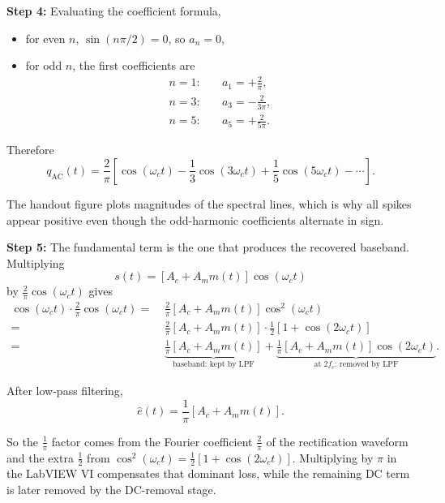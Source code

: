 \begin{tcolorbox}[breakable, colback=orange!5!white,
colframe=orange!60!black,
title={\textbf{Intuition: Fourier Series of the Rectification Function (Part 3: Final Series and the $\tfrac{1}{\pi}$ Result)}}]
\textbf{Step 4:} Evaluating the coefficient formula,
\begin{itemize}
\item for even $n$, $\sin(n\pi/2)=0$, so $a_n=0$,
\item for odd $n$, the first coefficients are
\begin{align}
n=1:&\quad a_1 = +\frac{2}{\pi}, \\
n=3:&\quad a_3 = -\frac{2}{3\pi}, \\
n=5:&\quad a_5 = +\frac{2}{5\pi}.
\end{align}
\end{itemize}

Therefore
\begin{equation}
\boxed{q_{\mathrm{AC}}(t)=\frac{2}{\pi}\left[
\cos(\omega_c t)-\frac{1}{3}\cos(3\omega_c t)
+\frac{1}{5}\cos(5\omega_c t)-\cdots\right]}.
\end{equation}

The handout figure plots magnitudes of the spectral lines, which is why all
spikes appear positive even though the odd-harmonic coefficients alternate in
sign.

\textbf{Step 5:} The fundamental term is the one that produces the recovered
baseband. Multiplying
\begin{equation}
s(t)=\left[A_c + A_m m(t)\right]\cos(\omega_c t)
\end{equation}
by $\tfrac{2}{\pi}\cos(\omega_c t)$ gives
\begin{align}
[A_c + A_m m(t)]\cos(\omega_c t)\cdot \frac{2}{\pi}\cos(\omega_c t)
=\;&\frac{2}{\pi}[A_c + A_m m(t)]\cos^2(\omega_c t)\nonumber\\
=\;&\frac{2}{\pi}[A_c + A_m m(t)]\cdot\frac{1}{2}
\left[1+\cos(2\omega_c t)\right]\nonumber\\
=\;&\underbrace{\frac{1}{\pi}[A_c + A_m m(t)]}_{\text{baseband: kept by LPF}}
+\underbrace{\frac{1}{\pi}[A_c + A_m m(t)]\cos(2\omega_c t)}_{\text{at }2f_c\text{: removed by LPF}}.
\end{align}

After low-pass filtering,
\begin{equation}
\boxed{\hat{e}(t)=\frac{1}{\pi}[A_c + A_m m(t)]}.
\end{equation}

So the $\tfrac{1}{\pi}$ factor comes from the Fourier coefficient
$\tfrac{2}{\pi}$ of the rectification waveform and the extra $\tfrac{1}{2}$
from $\cos^2(\omega_c t)=\tfrac{1}{2}[1+\cos(2\omega_c t)]$. Multiplying by
$\pi$ in the LabVIEW VI compensates that dominant loss, while the remaining DC
term is later removed by the DC-removal stage.
\end{tcolorbox}

